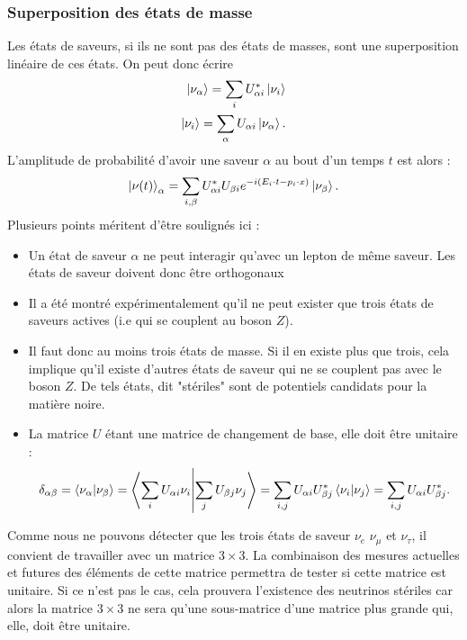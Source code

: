             \subsubsection{Superposition des états de masse}
            Les états de saveurs, si ils ne sont pas des états de masses, sont une superposition linéaire de ces états. On peut donc écrire
            \begin{eqnarray}
            \ket{\nu_{\alpha}} = \sum_i U_{\alpha i}^*\ket{\nu_i} \label{eq::alphatoi} \\
            \ket{\nu_i} = \sum_{\alpha} U_{\alpha i}\ket{\nu_{\alpha}}.
            \end{eqnarray}
            L'amplitude de probabilité d'avoir une saveur $\alpha$ au bout d'un temps $t$ est alors :
            \begin{equation}
                \ket{\nu(t)}_{\alpha} = \sum_{i,\beta} U_{\alpha i}^*U_{\beta i} e^{-i(E_i \cdot t - p_i\cdot x)}\ket{\nu_{\beta}}.
            \end{equation}
            Plusieurs points méritent d'être soulignés ici :
            \begin{itemize}
                \item Un état de saveur $\alpha$ ne peut interagir qu'avec un lepton de même saveur. Les états de saveur doivent donc être orthogonaux
                \item Il a été montré expérimentalement qu'il ne peut exister que trois états de saveurs actives (i.e qui se couplent au boson $Z$)\cite{pdg2018}.
                \item Il faut donc au moins trois états de masse. Si il en existe plus que trois, cela implique qu'il existe d'autres états de saveur qui ne se couplent pas avec le boson $Z$. De tels états, dit "stériles" sont de potentiels candidats pour la matière noire.
                \item La matrice $U$ étant une matrice de changement de base, elle doit être unitaire :
                \begin{equation*}
                    \delta_{\alpha\beta} = \braket{\nu_{\alpha}}{\nu_{\beta}} = \braket{\sum_i U_{\alpha i}\nu_i}{\sum_j U_{\beta j}\nu_j} = \sum_{i,j} U_{\alpha i}U_{\beta j}^* \braket{\nu_i}{\nu_j} = \sum_{i,j} U_{\alpha i}U_{\beta j}^*.
                \end{equation*}
            \end{itemize}
            Comme nous ne pouvons détecter que les trois états de saveur $\nu_e$ $\nu_{\mu}$ et $\nu_{\tau}$, il convient de travailler avec un matrice $3\times3$. La combinaison des mesures actuelles et futures des éléments de cette matrice\cite{Qian2013} permettra de tester si cette matrice est unitaire. Si ce n'est pas le cas, cela prouvera l'existence des neutrinos stériles car alors la matrice $3\times3$ ne sera qu'une sous-matrice d'une matrice plus grande qui, elle, doit être unitaire.
            
